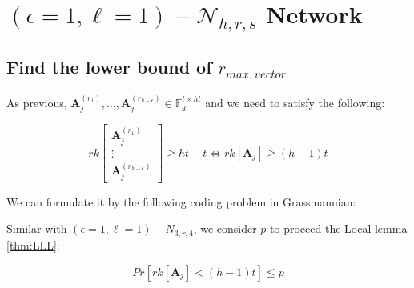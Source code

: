 \section{$\left(\epsilon=1,\ell=1\right)-\mathcal{N}_{h,r,s}$ Network \label{sec:e1l1_nw}}

\subsection{Find the lower bound of $r_{max,vector}$}

As previous, $\boldsymbol{A}_{j}^{\left(r_{1}\right)},\ldots,\boldsymbol{A}_{j}^{\left(r_{h-\epsilon}\right)}\in\ensuremath{\mathbb{F}}_{q}^{t\times ht}$
and we need to satisfy the following:

\[
rk\left[\begin{array}{c}
\boldsymbol{A}_{j}^{\left(r_{1}\right)}\\
\vdots\\
\boldsymbol{A}_{j}^{\left(r_{h-\epsilon}\right)}
\end{array}\right]\geq ht-t\Leftrightarrow rk\left[\boldsymbol{A}_{j}\right]\geq(h-1)t
\]

We can formulate it by the following coding problem in Grassmannian:

\noindent{}

Similar with $\left(\epsilon=1,\ell=1\right)-\ensuremath{N}_{3,r,4}$,
we consider $p$ to proceed the Local lemma \ref{thm:LLL}:

\begin{equation}
Pr\left[rk\left[\boldsymbol{A}_{j}\right]<(h-1)t\right]\leq p\label{eq:p_e1l1}
\end{equation}

